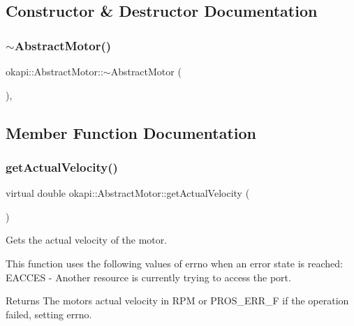 \subsection{Constructor \& Destructor Documentation}
\mbox{\label{classokapi_1_1AbstractMotor_a2cc6e2eb96fc99c426c3e6dda9e8f3da}} 
\subsubsection{\texorpdfstring{$\sim$AbstractMotor()}{~AbstractMotor()}}
{\footnotesize\ttfamily okapi\+::\+Abstract\+Motor\+::$\sim$\+Abstract\+Motor (\begin{DoxyParamCaption}{ }\end{DoxyParamCaption})\hspace{0.3cm}{\ttfamily [virtual]}, {\ttfamily [default]}}



\subsection{Member Function Documentation}
\mbox{\label{classokapi_1_1AbstractMotor_a45b2013cc318577fad4ac38ad22ce219}} 
\subsubsection{\texorpdfstring{getActualVelocity()}{getActualVelocity()}}
{\footnotesize\ttfamily virtual double okapi\+::\+Abstract\+Motor\+::get\+Actual\+Velocity (\begin{DoxyParamCaption}{ }\end{DoxyParamCaption})\hspace{0.3cm}{\ttfamily [pure virtual]}}

Gets the actual velocity of the motor.

This function uses the following values of errno when an error state is reached\+: E\+A\+C\+C\+ES -\/ Another resource is currently trying to access the port.

\begin{DoxyReturn}{Returns}
The motor\textquotesingle{}s actual velocity in R\+PM or P\+R\+O\+S\+\_\+\+E\+R\+R\+\_\+F if the operation failed, setting errno. 
\end{DoxyReturn}


